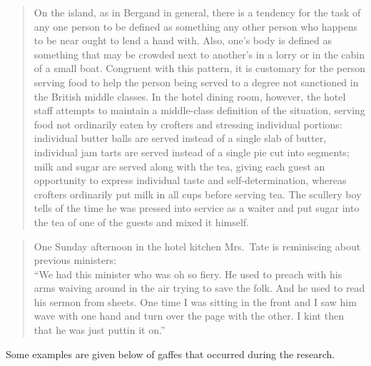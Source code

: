 \documentclass[openany,nobib]{tufte-book}
\begin{document}
\begin{quote}
On the island, as in Bergand in general, there is a tendency for the
task of any one person to be defined as something any other person who
happens to be near ought to lend a hand with. Also, one's body is
defined as something that may be crowded next to another's in a lorry or
in the cabin of a small boat. Congruent with this pattern, it is
customary for the person serving food to help the person being served to
a degree not sanctioned in the British middle classes. In the hotel
dining room, however, the hotel staff attempts to maintain a
middle-class definition of the situation, serving food not ordinarily
eaten by crofters and stressing individual portions: individual butter
balls are served instead of a single slab of butter, individual jam
tarts are served instead of a single pie cut into segments; milk and
sugar are served along with the tea, giving each guest an opportunity to
express individual taste and self-determination, whereas crofters
ordinarily put milk in all cups before serving tea. The scullery boy
tells of the time he was pressed into service as a waiter and put sugar
into the tea of one of the guests and mixed it himself.
\end{quote}

\begin{quote}
One Sunday afternoon in the hotel kitchen Mrs.~Tate is reminiscing about
previous ministers:\\
``We had this minister who was oh so fiery. He used to preach with his
arms waiving around in the air trying to save the folk. And he used to
read his sermon from sheets. One time I was sitting in the front and I
saw him wave with one hand and turn over the page with the other. I kint
then that he was just puttin it on.''
\end{quote}

Some examples are given below of gaffes that occurred during the
research.
\end{document}
